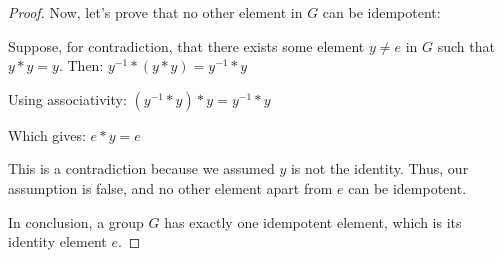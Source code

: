 \documentclass[12pt]{amsart}
\theoremstyle{definition}
\numberwithin{equation}{section}
\theoremstyle{plain}
\begin{document}
\begin{exercise}{31}
\begin{proof}
Now, let's prove that no other element in \( G \) can be idempotent:

Suppose, for contradiction, that there exists some element \( y \neq e \) in \( G \) such that \( y * y = y \). Then:
\( y^{-1} * (y * y) = y^{-1} * y \)

Using associativity:
\( (y^{-1} * y) * y = y^{-1} * y \)

Which gives:
\( e * y = e \)

This is a contradiction because we assumed \( y \) is not the identity. Thus, our assumption is false, and no other element apart from \( e \) can be idempotent.

In conclusion, a group \( G \) has exactly one idempotent element, which is its identity element \( e \).
    \end{proof}
    \end{exercise}
\end{document}
